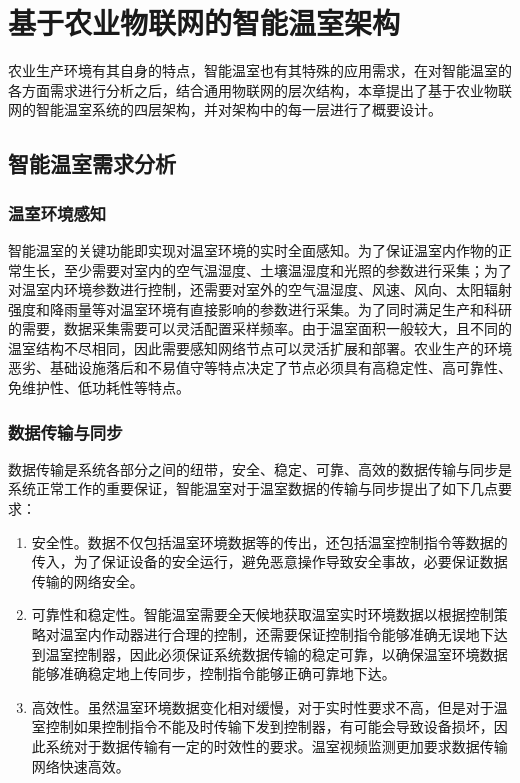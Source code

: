 
\chapter{基于农业物联网的智能温室架构}
\label{chapter:IoT Architecture}
农业生产环境有其自身的特点，智能温室也有其特殊的应用需求，在对智能温室的各方面需求进行分析之后，结合通用物联网的层次结构，本章提出了基于农业物联网的智能温室系统的四层架构，并对架构中的每一层进行了概要设计。

\section{智能温室需求分析}
	\subsection{温室环境感知}
智能温室的关键功能即实现对温室环境的实时全面感知。为了保证温室内作物的正常生长，至少需要对室内的空气温湿度、土壤温湿度和光照的参数进行采集\supercite{ZhouTao2015}；为了对温室内环境参数进行控制，还需要对室外的空气温湿度、风速、风向、太阳辐射强度和降雨量等对温室环境有直接影响的参数进行采集。为了同时满足生产和科研的需要，数据采集需要可以灵活配置采样频率。由于温室面积一般较大，且不同的温室结构不尽相同，因此需要感知网络节点可以灵活扩展和部署。农业生产的环境恶劣、基础设施落后和不易值守等特点决定了节点必须具有高稳定性、高可靠性、免维护性、低功耗性等特点。
	\subsection{数据传输与同步}
数据传输是系统各部分之间的纽带，安全、稳定、可靠、高效的数据传输与同步是系统正常工作的重要保证，智能温室对于温室数据的传输与同步提出了如下几点要求：
		\begin{enumerate}
			\item 安全性。数据不仅包括温室环境数据等的传出，还包括温室控制指令等数据的传入，为了保证设备的安全运行，避免恶意操作导致安全事故，必要保证数据传输的网络安全。
			\item 可靠性和稳定性。智能温室需要全天候地获取温室实时环境数据以根据控制策略对温室内作动器进行合理的控制，还需要保证控制指令能够准确无误地下达到温室控制器，因此必须保证系统数据传输的稳定可靠，以确保温室环境数据能够准确稳定地上传同步，控制指令能够正确可靠地下达。
			\item 高效性。虽然温室环境数据变化相对缓慢，对于实时性要求不高，但是对于温室控制如果控制指令不能及时传输下发到控制器，有可能会导致设备损坏，因此系统对于数据传输有一定的时效性的要求。温室视频监测更加要求数据传输网络快速高效。	
		\end{enumerate}

